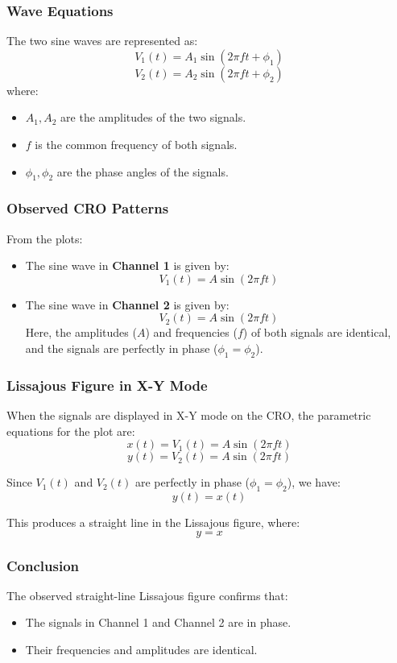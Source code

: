\documentclass[12pt,a4paper]{report}
\begin{document}
\subsubsection*{Wave Equations}
The two sine waves are represented as:
\[
V_1(t) = A_1 \sin(2 \pi f t + \phi_1)
\]
\[
V_2(t) = A_2 \sin(2 \pi f t + \phi_2)
\]
where:
\begin{itemize}
    \item \(A_1, A_2\) are the amplitudes of the two signals.
    \item \(f\) is the common frequency of both signals.
    \item \(\phi_1, \phi_2\) are the phase angles of the signals.
\end{itemize}

\subsubsection*{Observed CRO Patterns}
From the plots:
\begin{itemize}
    \item The sine wave in \textbf{Channel 1} is given by:
    \[
    V_1(t) = A \sin(2 \pi f t)
    \]
    \item The sine wave in \textbf{Channel 2} is given by:
    \[
    V_2(t) = A \sin(2 \pi f t)
    \]
    Here, the amplitudes (\(A\)) and frequencies (\(f\)) of both signals are identical, and the signals are perfectly in phase (\(\phi_1 = \phi_2\)).
\end{itemize}

\subsubsection*{Lissajous Figure in X-Y Mode}
When the signals are displayed in X-Y mode on the CRO, the parametric equations for the plot are:
\[
x(t) = V_1(t) = A \sin(2 \pi f t)
\]
\[
y(t) = V_2(t) = A \sin(2 \pi f t)
\]

Since \(V_1(t)\) and \(V_2(t)\) are perfectly in phase (\(\phi_1 = \phi_2\)), we have:
\[
y(t) = x(t)
\]

This produces a straight line in the Lissajous figure, where:
\[
y = x
\]
\subsubsection*{Conclusion}
The observed straight-line Lissajous figure confirms that:
\begin{itemize}
    \item The signals in Channel 1 and Channel 2 are in phase.
    \item Their frequencies and amplitudes are identical.
\end{itemize}
\end{document}
